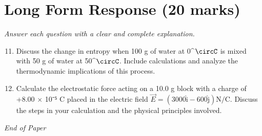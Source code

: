\documentclass[12pt]{article}
\begin{document}
\section*{Long Form Response (20 marks)}
\textit{Answer each question with a clear and complete explanation.}
\begin{enumerate}[label=\arabic*.]
\setcounter{enumi}{10}
\item Discuss the change in entropy when 100 g of water at 0^\ensuremath{\circC} is mixed with 50 g of water at 50^\ensuremath{\circC}. Include calculations and analyze the thermodynamic implications of this process.
\item Calculate the electrostatic force acting on a 10.0 g block with a charge of +8.00 \ensuremath{\times} 10⁻⁵ C placed in the electric field \(\vec{E}=(3000 \hat{\mathrm{i}}-600 \hat{\mathrm{j}}) \mathrm{N/C}\). Discuss the steps in your calculation and the physical principles involved.
\end{enumerate}

\vfill
\noindent\textit{End of Paper}
\end{document}
